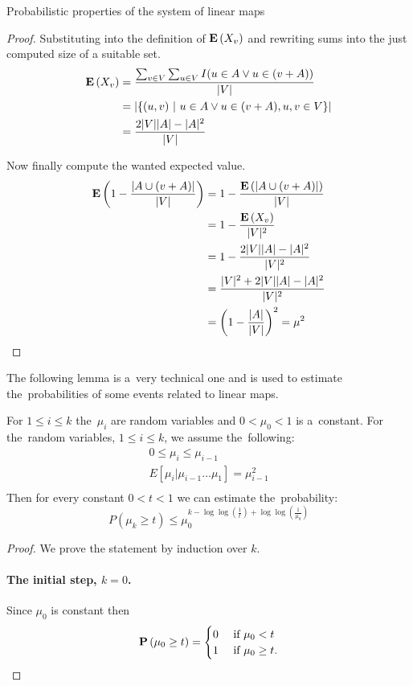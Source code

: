 \begin{section}{Probabilistic properties of the system of linear maps}
\begin{lemma}
\begin{proof}
Substituting into the definition of $\mathbf{E}\left(X_v\right)$ and rewriting sums into the just computed size of a suitable set.
\[
\begin{split}
\mathbf{E}\left(X_v\right) 
	& = \frac{\sum_{v \in V} \sum_{u \in V} I(u \in A \vee u \in (v + A))}{|V|}  \\
	& = |\{(u, v) \ | \  u \in A \vee u \in (v + A), u, v \in V \}| \\ 
	& = \frac{2|V||A| - |A|^2}{|V|} \\
\end{split}
\]

Now finally compute the wanted expected value.
\[
\begin{split}
\mathbf{E}\left(1 - \frac{|A \cup (v + A)|}{|V|}\right) 
	& = 1 - \frac{\mathbf{E}\left(|A \cup (v + A)|\right)}{|V|}  \\
	& = 1 - \frac{\mathbf{E}\left(X_v\right)}{|V|^2} \\
	& = 1 - \frac{2|V||A| - |A|^2}{|V|^2} \\
	& = \frac{|V|^2 + 2|V||A| - |A|^2}{|V|^2} \\
	& = \left(1 - \frac{|A|}{|V|}\right)^2 = \mu^2 \\
\end{split}
\]
\end{proof}
\end{lemma}

The following lemma is a~very technical one and is used to estimate the~probabilities of some events related to linear maps.
\begin{lemma}
\label{lemma-random-variable}
For $1 \leq i \leq k$ the~$\mu_i$ are random variables and $0 < \mu_0 < 1$ is a~constant. For the~random variables, $1 \leq i \leq k$, we assume the~following:
\begin{gather*}
0 \leq \mu_i \leq \mu_{i - 1} \\
E[ \mu_i | \mu_{i-1} \dots \mu_1 ] = \mu_{i-1}^{2} \\
\end{gather*}
Then for every constant $0 < t < 1$ we can estimate the~probability:
\begin{displaymath}
P(\mu_k \geq t) \leq \mu_0^{k - \log \log (\frac{1}{t}) + \log \log \left(\frac{1}{\mu_0}\right)}
\end{displaymath}
\end{lemma}
\begin{proof}
We prove the statement by induction over $k$. 

\paragraph*{The initial step, $k = 0$.}
Since $\mu_0$ is constant then 
\[
	\mathbf{P}\left(\mu_0 \geq t\right) = \begin{cases}
		0 & \text{ if } \mu_0 < t \\
		1 & \text{ if } \mu_0 \geq t \text{.} \\
	\end{cases}
\]


\end{proof}
\end{section}
